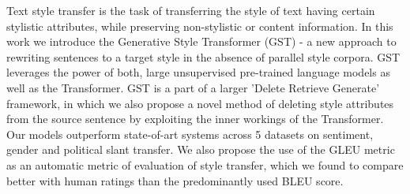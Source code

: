 Text style transfer is the task of transferring the style of text having certain stylistic attributes, while preserving non-stylistic or content information. In this work we introduce the Generative Style Transformer (GST) - a new approach to rewriting sentences to a target style in the absence of parallel style corpora. GST leverages the power of both, large unsupervised pre-trained language models as well as the Transformer.  GST is a part of a larger 'Delete Retrieve Generate' framework, in which we also propose a novel method of deleting style attributes from the source sentence by exploiting the inner workings of the Transformer. Our models outperform state-of-art systems across 5 datasets on sentiment, gender and political slant transfer. We also propose the use of the GLEU metric as an automatic metric of evaluation of style transfer, which we found to compare better with human ratings than the predominantly used BLEU score.